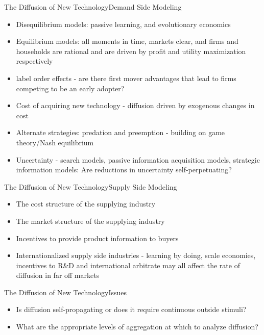 \documentclass{beamer}
\begin{document}
\begin{frame}{The Diffusion of New Technology}{Demand Side Modeling}
\begin{itemize}
\item{Disequilibrium models: passive learning, and evolutionary economics}
\item{Equilibrium models: all moments in time, markets clear, and firms and households are rational and are driven by profit and utility maximization respectively}
\item{label order effects - are there first mover advantages that lead to firms competing to be an early adopter?}
\item{Cost of acquiring new technology - diffusion driven by exogenous changes in cost}
\item{Alternate strategies: predation and preemption - building on game theory/Nash equilibrium}
\item{Uncertainty - search models, passive information acquisition models, strategic information models: Are reductions in uncertainty self-perpetuating?}

\end{itemize}
\end{frame}

\begin{frame}{The Diffusion of New Technology}{Supply Side Modeling}
\begin{itemize}
\item{The cost structure of the supplying industry}
\item{The market structure of the supplying industry}
\item{Incentives to provide product information to buyers}
\item{Internationalized supply side industries - learning by doing, scale economies, incentives to R\&D and international arbitrate may all affect the rate of diffusion in far off markets}
\end{itemize}
\end{frame}

\begin{frame}{The Diffusion of New Technology}{Issues}
\begin{itemize}
\item{Is diffusion self-propagating or does it require continuous outside stimuli?}
\item{What are the appropriate levels of aggregation at which to analyze diffusion?}
\end{itemize}
\end{frame}
\end{document}
